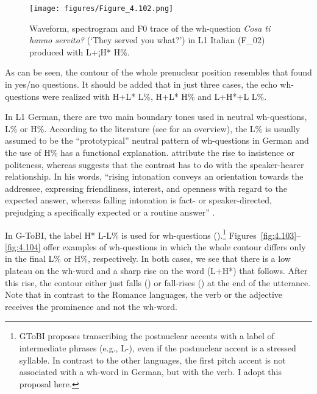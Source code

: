 \begin{figure}


\texttt{[image: figures/Figure\_4.102.png]}


\caption{Waveform, spectrogram and F0 trace of the wh-question \textit{Cosa ti hanno servito?} (‘They served you what?’) in L1 Italian (F\_02) produced with L+¡H* H\%.}
\label{fig:4.102}
\end{figure}

As can be seen, the contour of the whole prenuclear position resembles that found in yes/no questions. It should be added that in just three cases, the echo wh-questions were realized with H+L* L\%, H+L* H\% and L+H*+L L\%.


In L1 German, there are two main boundary tones used in neutral wh-ques\-tions, L\% or H\%. According to the literature (see \citealt{Klein1982, Kohler2005, PetroneNiebuhr2014} for an overview), the L\% is usually assumed to be the “prototypical” neutral pattern of wh-questions in German and the use of H\% has a functional explanation. \citet[12]{GriceBaumann2007} attribute the rise to insistence or politeness, whereas \citet{Kohler2005} suggests that the contrast has to do with the speaker-hearer relationship. In his words, “rising intonation conveys an orientation towards the addressee, expressing friendliness, interest, and openness with regard to the expected answer, whereas falling intonation is fact- or speaker-directed, prejudging a specifically expected or a routine answer” \citep[128]{Kohler2005}.



In G-ToBI, the label H* L-L\% is used for wh-questions (\citealt{Féry1993, GriceBaumann2002, GriceEtAl2005a}).\footnote{GToBI proposes transcribing the postnuclear accents with a label of intermediate phrases (e.g., L-), even if the postnuclear accent is a stressed syllable. In contrast to the other languages, the first pitch accent is not associated with a wh-word in German, but with the verb. I adopt this proposal here.} Figures~\ref{fig:4.103}--\ref{fig:4.104} offer examples of wh-questions in which the whole contour differs only in the final L\% or H\%, respectively. In both cases, we see that there is a low plateau on the wh-word and a sharp rise on the word (L+H*) that follows. After this rise, the contour either just falls () or fall-rises () at the end of the utterance. Note that in contrast to the Romance languages, the verb or the adjective receives the prominence and not the wh-word.


